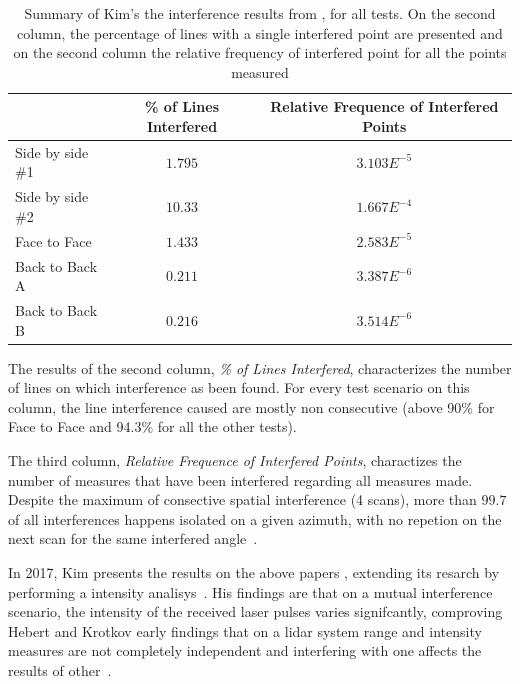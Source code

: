 \begin{table}[H]
	\centering
	\renewcommand{\arraystretch}{1.3}
		\begin{tabular}{@{}l|c|c@{}}
			                 & \% of Lines Interfered & Relative Frequence of Interfered Points \\ \midrule
			Side by side \#1 & $1.795$                & $3.103E^{-5}$  \\
			Side by side \#2 & $10.33$                & $1.667E^{-4}$ \\
			Face to Face     & $1.433$                & $2.583E^{-5}$  \\
			Back to Back A   & $0.211$                & $3.387E^{-6}$  \\
			Back to Back B   & $0.216$                & $3.514E^{-6}$  \\ \bottomrule
		\end{tabular}%
		\caption{Summary of Kim's \etal the interference results from \cite{Kim2015b, Kim2015c}, for all tests. On the second column, the percentage of lines with a single interfered point are presented and on the second column the relative frequency of interfered point for all the points measured}
	\label{tab:kim_2015_results}
\end{table}

The results of the second column, \textit{\% of Lines Interfered}, characterizes the number of lines on which interference as been found. For every test scenario on this column, the line interference caused are mostly non consecutive (above 90\% for Face to Face and 94.3\% for all the other tests).

The third column, \textit{Relative Frequence of Interfered Points}, charactizes the number of measures that have been interfered regarding all measures made. Despite the maximum of consective spatial interference (4 scans), more than $99.7$ of all interferences happens isolated on a given azimuth, with no repetion on the next scan for the same interfered angle~\cite{Kim2015c}.





In 2017, Kim \etal presents the results on the above papers \cite{Kim2015a, Kim2015b, Kim2015c}, extending its resarch by performing a intensity analisys~\cite{Kim2017}. His findings are that on a mutual interference scenario, the intensity of the received laser pulses varies signifcantly, comproving Hebert and Krotkov early findings that on a \ac{lidar} system range and intensity measures are not completely independent and interfering with one affects the results of other~\cite{Hebert}.

